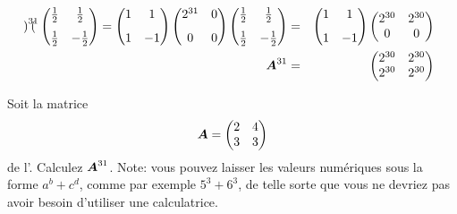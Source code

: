 \begin{exemple}
\begin{eqnarray*}
\begin{pmatrix}
\end{pmatrix}^{31}
\begin{pmatrix}
\frac12 & \frac12 \\[7pt]
\frac12 & -\frac12
\end{pmatrix}
=
\begin{pmatrix}
1 & 1 \\[7pt] 1 & -1
\end{pmatrix}
\begin{pmatrix}
2^{31} & 0 \\[7pt] 0 & 0
\end{pmatrix}
\begin{pmatrix}
\frac12 & \frac12 \\[7pt]
\frac12 & -\frac12
\end{pmatrix}
&=&
\begin{pmatrix}
1 & 1 \\[7pt] 1 & -1
\end{pmatrix}
\begin{pmatrix}
2^{30} & 2^{30} \\ 0 & 0
\end{pmatrix}\\
\boldsymbol{A}^{31}&=&\begin{pmatrix}
2^{30} & 2^{30} \\ 2^{30} & 2^{30}
\end{pmatrix}
\end{eqnarray*}
\end{exemple}

\begin{exerciceC}
Soit la matrice \[
\boldsymbol{A} = \begin{pmatrix}
2 & 4 \\ 3 & 3
\end{pmatrix}
\]
de l'.
Calculez $\boldsymbol{A}^{31}$. Note: vous pouvez laisser les valeurs numériques sous la forme
$a^b + c^d$, comme par exemple $5^3 + 6^3$, de telle sorte que vous ne devriez pas
avoir besoin d'utiliser une calculatrice.
\end{exerciceC}

